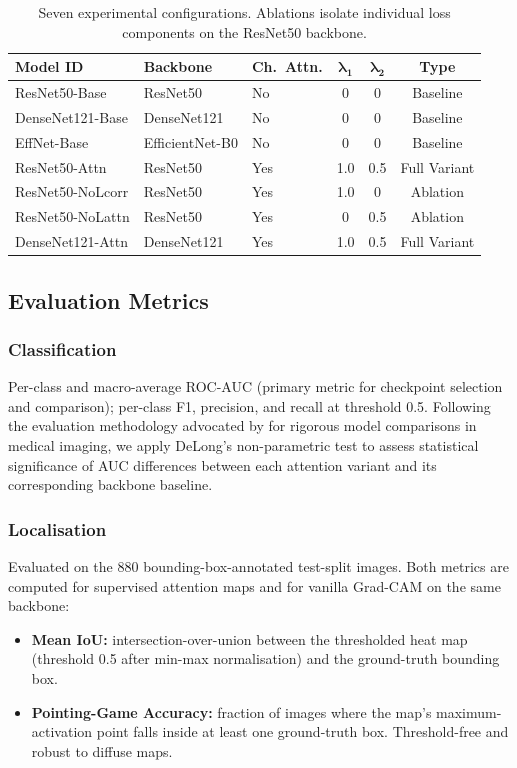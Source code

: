 \documentclass[12pt, a4paper]{article}
\begin{document}
\begin{table}[H]
  \centering
  \caption{Seven experimental configurations. Ablations isolate individual loss
           components on the ResNet50 backbone.}
  \label{tab:configs}
  \begin{tabular}{lllccc}
    \toprule
    \textbf{Model ID} & \textbf{Backbone} & \textbf{Ch.\ Attn.} &
      $\boldsymbol{\lambda_1}$ & $\boldsymbol{\lambda_2}$ & \textbf{Type} \\
    \midrule
    ResNet50-Base    & ResNet50       & No  & 0   & 0   & Baseline \\
    DenseNet121-Base & DenseNet121    & No  & 0   & 0   & Baseline \\
    EffNet-Base      & EfficientNet-B0& No  & 0   & 0   & Baseline \\
    ResNet50-Attn    & ResNet50       & Yes & 1.0 & 0.5 & Full Variant \\
    ResNet50-NoLcorr & ResNet50       & Yes & 1.0 & 0   & Ablation \\
    ResNet50-NoLattn & ResNet50       & Yes & 0   & 0.5 & Ablation \\
    DenseNet121-Attn & DenseNet121    & Yes & 1.0 & 0.5 & Full Variant \\
    \bottomrule
  \end{tabular}
\end{table}

\subsection{Evaluation Metrics}

\subsubsection{Classification}
Per-class and macro-average ROC-AUC (primary metric for checkpoint selection and
comparison); per-class F1, precision, and recall at threshold 0.5. Following the
evaluation methodology advocated by \citet{varoquaux2022} for rigorous model comparisons
in medical imaging, we apply DeLong's non-parametric test to assess statistical
significance of AUC differences between each attention variant and its corresponding
backbone baseline.

\subsubsection{Localisation}
Evaluated on the 880 bounding-box-annotated test-split images. Both metrics are computed
for supervised attention maps and for vanilla Grad-CAM on the same backbone:
\begin{itemize}[leftmargin=1.5em, itemsep=2pt]
  \item \textbf{Mean IoU:} intersection-over-union between the thresholded heat map
        (threshold 0.5 after min-max normalisation) and the ground-truth bounding box.
  \item \textbf{Pointing-Game Accuracy:} fraction of images where the map's
        maximum-activation point falls inside at least one ground-truth box.
        Threshold-free and robust to diffuse maps.
\end{itemize}
\end{document}

